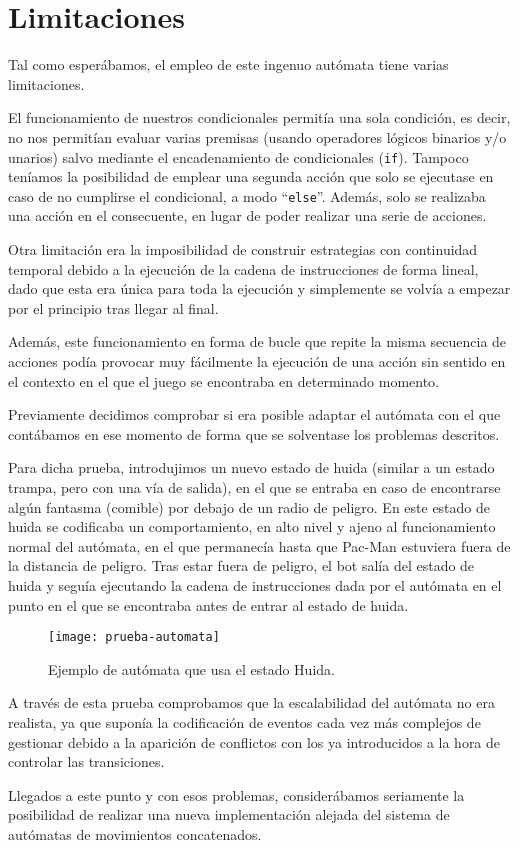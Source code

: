 \section{Limitaciones}
Tal como esperábamos, el empleo de este ingenuo autómata tiene varias limitaciones.
 
El funcionamiento de nuestros condicionales permitía una sola condición, es decir, no nos permitían evaluar varias premisas (usando operadores lógicos binarios y/o unarios) salvo mediante el encadenamiento de condicionales (\texttt{if}). 
Tampoco teníamos la posibilidad de emplear una segunda acción que solo se ejecutase en caso de no cumplirse el condicional, a modo ``\texttt{else}''. Además, solo se realizaba una acción en el consecuente, en lugar de poder realizar una serie de acciones. 
 
Otra limitación era la imposibilidad de construir estrategias con continuidad temporal debido a la ejecución de la cadena de instrucciones de forma lineal, dado que esta era única para toda la ejecución y simplemente se volvía a empezar por el principio tras llegar al final.
 
Además, este funcionamiento en forma de bucle que repite la misma secuencia de acciones podía provocar muy fácilmente la ejecución de una acción sin sentido en el contexto en el que el juego se encontraba en determinado momento.
 
Previamente decidimos comprobar si era posible adaptar el autómata con el que contábamos en ese momento de forma que se solventase los problemas descritos.
 
Para dicha prueba, introdujimos un nuevo estado de huida (similar a un estado trampa, pero con una vía de salida), en el que se entraba en caso de encontrarse algún fantasma (comible) por debajo de un radio de peligro. 
En este estado de huida se codificaba un comportamiento, en alto nivel y ajeno al funcionamiento normal del autómata, en el que permanecía hasta que Pac-Man estuviera fuera de la distancia de peligro. Tras estar fuera de peligro, el bot salía del estado de huida y seguía ejecutando la cadena de instrucciones dada por el autómata en el punto en el que se encontraba antes de entrar al estado de huida.
\begin{figure}[H]
\centering
\texttt{[image: prueba-automata]}
\caption{Ejemplo de autómata que usa el estado Huida.}
\end{figure}

A través de esta prueba comprobamos que la escalabilidad del autómata no era realista, ya que suponía la codificación de eventos cada vez más complejos de gestionar debido a la aparición de conflictos con los ya introducidos a la hora de controlar las transiciones.
 
Llegados a este punto y con esos problemas, considerábamos seriamente la posibilidad de realizar una nueva implementación alejada del sistema de autómatas de movimientos concatenados.
